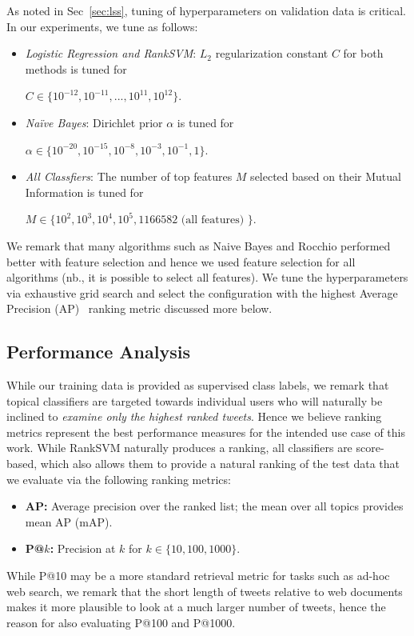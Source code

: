 \documentclass[letterpaper]{article}
\begin{document}
As noted in Sec~\ref{sec:lss}, tuning of hyperparameters on validation
data is critical.  In our experiments, we tune as follows: %
\begin{itemize}%
\item \textit{Logistic Regression and RankSVM}: $L_2$ regularization constant $C$ for both methods is tuned for 

$C \in \{10^{-12}, 10^{-11}, ..., 10^{11}, 10^{12} \}$.
\item \textit{Na\"{i}ve Bayes}: Dirichlet prior $\alpha$ is tuned for 

$\alpha \in \{10^{-20}, 10^{-15}, 10^{-8}, 10^{-3}, 10^{-1}, 1\}$.
\item \textit{All Classfiers}: The number of top features $M$ selected based on their Mutual Information is tuned for

 $M \in \{10^{2}, 10^{3}, 10^{4}, 10^{5}, 1166582 \textrm{ (all features) } \}$.
\end{itemize}
We remark that many algorithms such as Naive Bayes and Rocchio
performed better with feature selection and hence we used feature
selection for all algorithms (nb., it is possible to select all
features).  
We tune the hyperparameters via exhaustive grid search
and select the configuration with the highest Average Precision
(AP)~\cite{manning_ir} ranking metric discussed more below.

\subsection{Performance Analysis}

While our training data
is provided as supervised class labels, we remark that topical classifiers
are targeted towards individual users who will naturally be inclined 
to \emph{examine only the highest ranked tweets}.  Hence we believe ranking
metrics represent the best performance measures for the intended use case of this work.
While RankSVM naturally produces a ranking, all classifiers are score-based, which also allows
them to provide a natural ranking of the test data that we evaluate via the following
ranking metrics:
\begin{itemize}
\item {\bf AP:} Average precision over the ranked list; the mean over
all topics provides mean AP (mAP).
\item {\bf P@$k$:} Precision at $k$ for $k \in \{ 10, 100, 1000 \}$.
\end{itemize}
While P@10 may be a more standard retrieval metric for tasks such
as ad-hoc web search, we remark that the short length of tweets relative
to web documents makes it more plausible to look at a much larger number
of tweets, hence the reason for also evaluating P@100 and P@1000.
\end{document}

